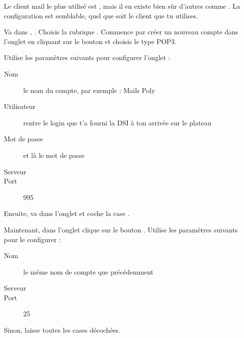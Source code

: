  Le client mail le plus
utilis\'e est , mais il en existe bien s\^ur d'autres comme
. La configuration est semblable, quel que soit le
client que tu utilises.

Va dans , . Choisis la
rubrique . Commence par cr\'eer un nouveau compte dans
l'onglet  en cliquant sur le bouton
 et choisis le type POP3.


Utilise les param\`etres suivants pour configurer l'onglet
 :
\begin{description}
  \item[Nom] le nom du compte, par exemple : Mails Poly
  \item[Utilisateur] rentre le login  que t'a fourni la DSI \`a ton arriv\'ee sur le plateau
  \item[Mot de passe] et l\`a le mot de passe 
  \item[Serveur] 
  \item[Port] 995
\end{description}

Ensuite, va dans l'onglet  et coche la case
.


Maintenant, dans l'onglet  clique sur le
bouton . Utilise les param\`etres suivants pour le
configurer :
\begin{description}
  \item[Nom] le m\^eme nom de compte que pr\'ec\'edemment
  \item[Serveur] 
  \item[Port] 25
\end{description}
Sinon, laisse toutes les cases d\'ecoch\'ees.

